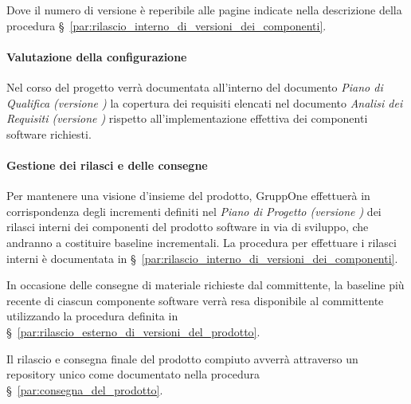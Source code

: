 \documentclass[../../norme-di-progetto.tex]{subfiles}
\begin{document}
Dove il numero di versione è reperibile alle pagine indicate nella descrizione della procedura §~\ref{par:rilascio_interno_di_versioni_dei_componenti}.


\paragraph{Valutazione della configurazione}%
\label{par:valutazione_della_configurazione}

Nel corso del progetto verrà documentata all'interno del documento \textit{Piano di Qualifica (versione \versione)} la copertura dei requisiti elencati nel documento \textit{Analisi dei Requisiti (versione \versione)} rispetto all'implementazione effettiva dei componenti software richiesti.


\paragraph{Gestione dei rilasci e delle consegne}%
\label{par:gestione_dei_rilasci_e_delle_consegne}

Per mantenere una visione d'insieme del prodotto, GruppOne effettuerà in corrispondenza degli incrementi definiti nel \textit{Piano di Progetto (versione \versione)} dei rilasci interni dei componenti del prodotto software in via di sviluppo, che andranno a costituire baseline incrementali. La procedura per effettuare i rilasci interni è documentata in §~\ref{par:rilascio_interno_di_versioni_dei_componenti}.

In occasione delle consegne di materiale richieste dal committente, la baseline più recente di ciascun componente software verrà resa disponibile al committente utilizzando la procedura definita in §~\ref{par:rilascio_esterno_di_versioni_del_prodotto}.

Il rilascio e consegna finale del prodotto compiuto avverrà attraverso un repository unico come documentato nella procedura §~\ref{par:consegna_del_prodotto}.


\end{document}
